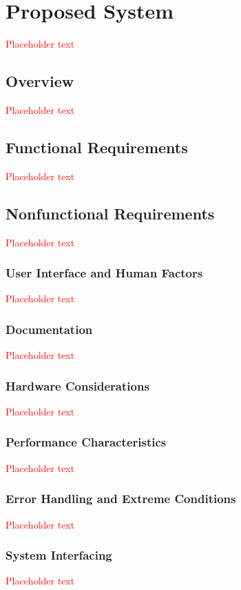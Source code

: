 \documentclass[a4paper, 11pt, titlepage]{article}
\begin{document}
\section{Proposed System}
\textcolor{red}{Placeholder text}

\subsection{Overview}
\textcolor{red}{Placeholder text}

\subsection{Functional Requirements}
\textcolor{red}{Placeholder text}

\subsection{Nonfunctional Requirements}
\textcolor{red}{Placeholder text}

\subsubsection{User Interface and Human Factors}
\textcolor{red}{Placeholder text}

\subsubsection{Documentation}
\textcolor{red}{Placeholder text}

\subsubsection{Hardware Considerations}
\textcolor{red}{Placeholder text}

\subsubsection{Performance Characteristics}
\textcolor{red}{Placeholder text}

\subsubsection{Error Handling and Extreme Conditions}
\textcolor{red}{Placeholder text}

\subsubsection{System Interfacing}
\textcolor{red}{Placeholder text}
\end{document}
